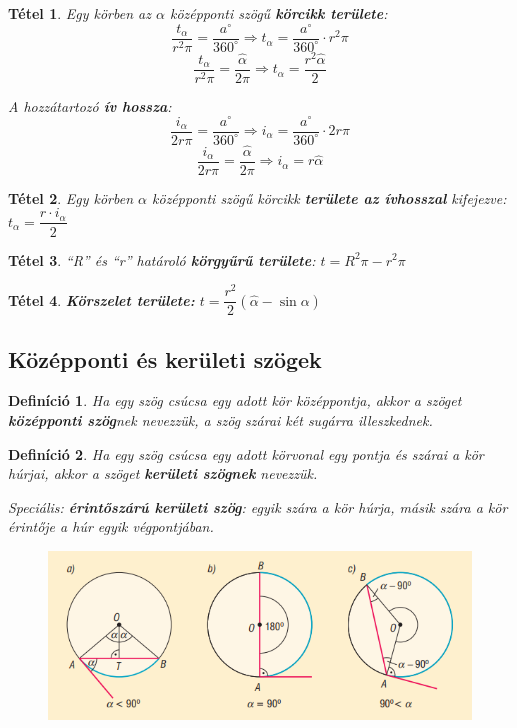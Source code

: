 \documentclass[12pt,a4paper]{article}
\newtheorem{theorem}{Tétel} [section]
\newtheorem{definition}{Definíció} [section]
\begin{document}
\begin{theorem}
Egy körben az $\alpha$ középponti szögű \textbf{körcikk területe}:
$$\dfrac{t_\alpha}{r^2\pi}=\dfrac{a^\circ}{360^\circ}\Rightarrow t_\alpha=\dfrac{a^\circ}{360^\circ}\cdot r^2\pi$$
$$\dfrac{t_\alpha}{r^2\pi}=\dfrac{\hat{\alpha}}{2\pi}\Rightarrow t_\alpha=\dfrac{r^2\hat{\alpha}}{2}$$

A hozzátartozó \textbf{ív hossza}:
$$\dfrac{i_\alpha}{2r\pi}=\dfrac{a^\circ}{360^\circ}\Rightarrow i_\alpha=\dfrac{a^\circ}{360^\circ}\cdot 2r\pi$$
$$\dfrac{i_\alpha}{2r\pi}=\dfrac{\hat{\alpha}}{2\pi}\Rightarrow i_\alpha = r\hat{\alpha}$$
\end{theorem}
\begin{theorem}
Egy körben $\alpha$ középponti szögű körcikk \textbf{területe az ívhosszal} kifejezve: $t_\alpha=\dfrac{r\cdot i_\alpha}{2}$
\end{theorem}

\begin{theorem}
``R'' és ``r'' határoló \textbf{körgyűrű területe}: $t=R^2\pi-r^2\pi$
\end{theorem}

\begin{theorem}
\textbf{Körszelet területe: } $t=\dfrac{r^2}{2}(\hat{\alpha}-\sin \alpha)$
\end{theorem}
\subsection{Középponti és kerületi szögek}

\begin{definition}
Ha egy szög csúcsa egy adott kör középpontja, akkor a szöget \textbf{középponti szög}nek nevezzük, a szög szárai két sugárra illeszkednek.
\end{definition}
\newpage
\begin{definition}
Ha egy szög csúcsa egy adott körvonal egy pontja és szárai a kör húrjai, akkor a szöget \textbf{kerületi szögnek} nevezzük.

Speciális: \textbf{érintőszárú kerületi szög}: egyik szára a kör húrja, másik szára a kör érintője a húr egyik végpontjában.
\end{definition}
\begin{figure}[h]
\centering
\includegraphics[scale=0.4]{geometry/keruleti_szog}
\end{figure}
\end{document}
